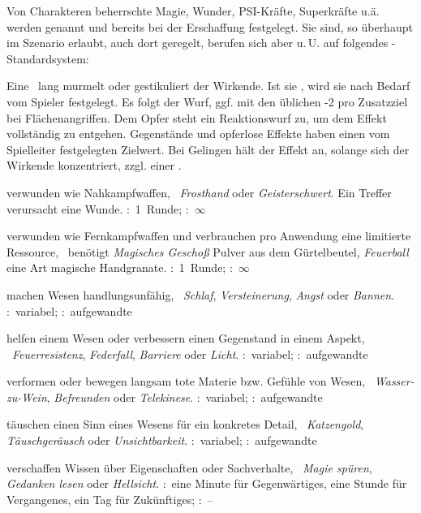 \begin{multicols}{2}


Von Charakteren beherrschte Magie, Wunder, PSI-Kräfte, Superkräfte u.ä. werden  genannt und bereits bei der Erschaffung festgelegt. Sie sind, so überhaupt im Szenario erlaubt, auch dort geregelt, berufen sich aber u.\,U. auf folgendes \nipajin-Standardsystem:

Eine  \VZ\ lang murmelt oder gestikuliert der Wirkende. Ist sie , wird sie nach Bedarf vom Spieler festgelegt. Es folgt der Wurf, ggf. mit den üblichen -2 pro Zusatzziel bei Flächenangriffen. Dem Opfer steht ein Reaktionswurf zu, um dem Effekt vollständig zu entgehen. Gegenstände und opferlose Effekte haben einen vom Spielleiter festgelegten Zielwert. Bei Gelingen hält der Effekt an, solange sich der Wirkende konzentriert, zzgl. einer  \NWZ. 

 verwunden wie Nah\-kampf\-waf\-fen, \zB\ \emph{Frosthand} oder \emph{Geisterschwert}. Ein Treffer verursacht eine Wunde. \VZ:~1~Runde; \NWZ:~$\infty$

 verwunden wie Fern\-kampf\-waf\-fen und verbrauchen pro Anwendung eine limitierte Ressource, \zB\ benötigt \emph{Magisches Geschoß} Pulver aus dem Gürtelbeutel, \emph{Feuerball} eine Art magische Handgranate. \VZ:~1~Runde; \NWZ:~$\infty$

 machen Wesen handlungsunfähig, \zB\ \emph{Schlaf}, \emph{Versteinerung}, \emph{Angst} oder \emph{Bannen}. \VZ:~variabel; \NWZ:~aufgewandte \VZ

 helfen einem Wesen oder verbessern einen Gegenstand in einem Aspekt, \zB\ \emph{Feuerresistenz}, \emph{Federfall}, \emph{Barriere} oder \emph{Licht}. \VZ:~variabel; \NWZ:~aufgewandte \VZ

 verformen oder bewegen langsam tote Materie bzw. Gefühle von Wesen, \zB\ \emph{Wasser-zu-Wein}, \emph{Befreunden} oder \emph{Telekinese}. \VZ:~variabel; \NWZ:~aufgewandte \VZ

 täuschen einen Sinn eines Wesens für ein konkretes Detail, \zB\ \emph{Katzengold}, \emph{Täuschgeräusch} oder \emph{Unsichtbarkeit}. \VZ:~variabel; \NWZ:~aufgewandte \VZ

 verschaffen Wissen über Eigenschaften oder Sachverhalte, \zB\ \emph{Magie spüren}, \emph{Gedanken lesen} oder \emph{Hellsicht}. \VZ:~eine Minute für Gegenwärtiges, eine Stunde für Vergangenes, ein Tag für Zukünftiges; \NWZ:~--


\end{multicols}
